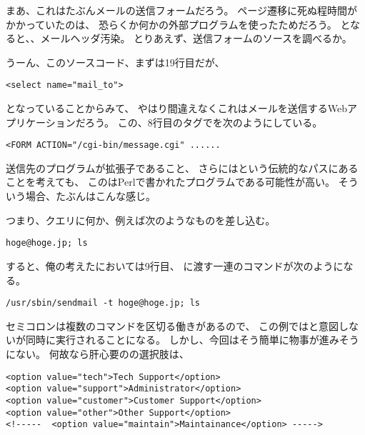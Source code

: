 まあ、これはたぶんメールの送信フォームだろう。
ページ遷移に死ぬ程時間がかかっていたのは、
恐らくか何かの外部プログラムを使ったためだろう。
となると、、メールヘッダ汚染。
とりあえず、送信フォームのソースを調べるか。



うーん、このソースコード、まずは19行目だが、

\begin{lstlisting}[style=html, firstnumber=19]
<select name="mail_to">
\end{lstlisting}

となっていることからみて、
やはり間違えなくこれはメールを送信するWebアプリケーションだろう。
この、8行目のタグでを次のようにしている。

\begin{lstlisting}[style=html, firstnumber=8]
<FORM ACTION="/cgi-bin/message.cgi" ......
\end{lstlisting}

送信先のプログラムが拡張子であること、
さらにはという伝統的なパスにあることを考えても、
このはPerlで書かれたプログラムである可能性が高い。
そういう場合、たぶんはこんな感じ。



つまり、クエリに何か、例えば次のようなものを差し込む。

\begin{lstlisting}
hoge@hoge.jp; ls
\end{lstlisting}

すると、俺の考えたにおいては9行目、
に渡す一連のコマンドが次のようになる。

\begin{lstlisting}
/usr/sbin/sendmail -t hoge@hoge.jp; ls
\end{lstlisting}

セミコロンは複数のコマンドを区切る働きがあるので、
この例ではと意図しないが同時に実行されることになる。
しかし、今回はそう簡単に物事が進みそうにない。
何故なら肝心要のの選択肢は、

\begin{lstlisting}[style=html, firstnumber=20]
<option value="tech">Tech Support</option>
<option value="support">Administrator</option>
<option value="customer">Customer Support</option>
<option value="other">Other Support</option>
<!-----  <option value="maintain">Maintainance</option> ----->
\end{lstlisting}

